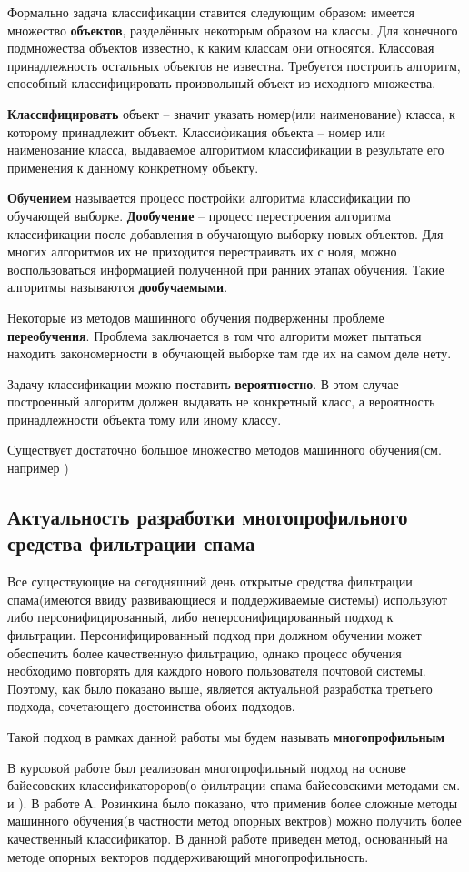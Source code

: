 Формально задача классификации ставится следующим образом: имеется множество \textbf{объектов}, разделённых некоторым образом на классы. Для конечного подмножества объектов известно, к каким классам они относятся. Классовая принадлежность остальных объектов не известна. Требуется построить алгоритм, способный классифицировать произвольный объект из исходного множества. 

\textbf{Классифицировать} объект – значит указать номер(или наименование) класса, к которому принадлежит объект. Классификация объекта – номер или  наименование класса, выдаваемое алгоритмом классификации в результате его применения к данному конкретному объекту.

\textbf{Обучением} называется процесс постройки алгоритма классификации по обучающей выборке. \textbf{Дообучение} – процесс перестроения алгоритма классификации после добавления в обучающую выборку новых объектов. Для многих алгоритмов их не приходится перестраивать их с ноля, можно воспользоваться информацией полученной при ранних этапах обучения. Такие алгоритмы называются \textbf{дообучаемыми}.

Некоторые из методов машинного обучения подверженны проблеме \textbf{переобучения}. Проблема заключается в том что алгоритм может пытаться находить закономерности в обучающей выборке там где их на самом деле нету.

Задачу классификации можно поставить \textbf{вероятностно}. В этом случае построенный  алгоритм должен выдавать не конкретный класс, а вероятность принадлежности объекта тому или иному классу.

Существует достаточно большое множество методов машинного обучения(см. например \cite{VORONCOV}) 

\subsection{Актуальность разработки многопрофильного средства фильтрации спама}

Все существующие на сегодняшний день открытые средства фильтрации спама(имеются ввиду развивающиеся и поддерживаемые системы) используют либо персонифицированный, либо неперсонифицированный подход к фильтрации. Персонифицированный подход при должном обучении может обеспечить более качественную фильтрацию, однако процесс обучения необходимо повторять для каждого нового пользователя почтовой системы. Поэтому, как было показано выше, является актуальной разработка третьего подхода, сочетающего достоинства обоих подходов. 

Такой подход в рамках данной работы мы будем называть \textbf{многопрофильным} 

В курсовой работе \cite{PETROV10} был реализован многопрофильный подход на основе байесовских классификатороров(о фильтрации спама байесовскими методами см. \cite{PLANFORSPAM} и \cite{ROBINSON} ). В работе А. Розинкина\cite{ROZ} было показано, что применив более сложные методы машинного обучения(в частности метод опорных вектров) можно получить более качественный классификатор. В данной работе приведен метод, основанный на методе опорных векторов поддерживающий многопрофильность.
